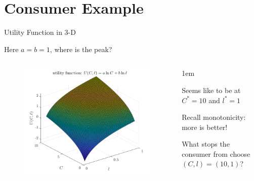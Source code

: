 \documentclass[11pt,aspectratio=43]{beamer}
\let\olditemize=\itemize
\let\endolditemize=\enditemize
\renewenvironment{itemize}{\olditemize \itemsep1em}{\endolditemize}
\theoremstyle{definition}
\begin{document}
\section{Consumer Example}
\label{sec:Consumer_Example}

\begin{frame}{Utility Function in 3-D}
\label{slide:Utility_Function_in_3_D}
    \begin{center}
        Here $ a = b = 1 $, \alert{where is the peak?}
    \end{center}
    \begin{columns}
        \begin{column}{0.7\textwidth}
            \begin{figure}
                \includegraphics[width=\textwidth]{./figures/Utility.png}
            \end{figure}
        \end{column}
        \begin{column}{0.3\textwidth}
            \begin{itemize}
                \item Seems like to be at $ C^{*} = 10 $ and $ l^{*} = 1 $
                \item Recall \alert{monotonicity}: more is better!
                \item What \alert{stops} the consumer from choose $ ( C, l ) = ( 10, 1 ) $?
            \end{itemize}
        \end{column}
    \end{columns}
\end{frame}
\end{document}
